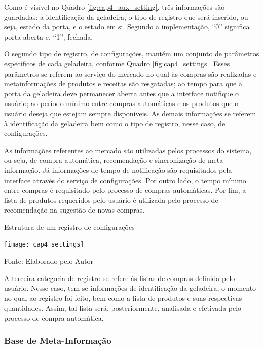 Como é visível no Quadro \ref{fig:cap4_aux_setting}, três informações são guardadas: a identificação da geladeira, o tipo de registro que será inserido, ou seja, estado da porta, e o estado em si. Segundo a implementação, ``0'' significa porta aberta e, ``1'', fechada.

O segundo tipo de registro, de configurações, mantém um conjunto de parâmetros específicos de cada geladeira, conforme Quadro \ref{fig:cap4_settings}. Esses parâmetros se referem ao serviço do mercado no qual às compras são realizadas e metainformações de produtos e receitas são resgatadas; ao tempo para que a porta da geladeira deve permanecer aberta antes que a interface notifique o usuário; ao período mínimo entre compras automáticas e os produtos que o usuário deseja que estejam sempre disponíveis. As demais informações se referem à identificação da geladeira bem como o tipo de registro, nesse caso, de configurações.

As informações referentes ao mercado são utilizadas pelos processos do sistema, ou seja, de compra automática, recomendação e sincronização de meta-informação. Já informações de tempo de notificação são requisitados pela interface através do serviço de configurações. Por outro lado, o tempo mínimo entre compras é requisitado pelo processo de compras automáticas. Por fim, a lista de produtos requeridos pelo usuário é utilizada pelo processo de recomendação na sugestão de novas compras.

\begin{quadro}[htb]
    \caption{Estrutura de um registro de configurações}
    \label{fig:cap4_settings}
    \texttt{[image: cap4\_settings]}
     
    \footnotesize{Fonte: Elaborado pelo Autor}
\end{quadro}

A terceira categoria de registro se refere às listas de compras definida pelo usuário. Nesse caso, tem-se informações de identificação da geladeira, o momento no qual ao registro foi feito, bem como a lista de produtos e suas respectivas quantidades. Assim, tal lista será, posteriormente, analisada e efetivada pelo processo de compra automática.



\ProximoForaDoSumario 
\subsubsection{Base de Meta-Informação} \label{sssec:metainfo}

